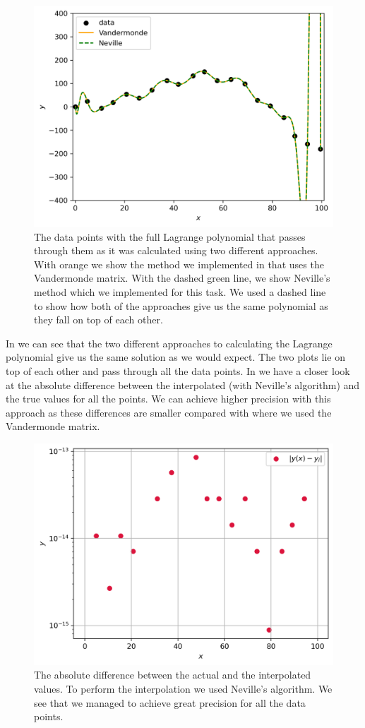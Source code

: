 \documentclass[a4paper,10pt]{article}
\begin{document}
\begin{figure}[H]
  \centering
  \includegraphics[width=0.75\linewidth]{./plots/compare.png}
  \caption{The data points with the full Lagrange polynomial that passes through them as it was calculated using two different approaches. With orange we show the method we implemented in  that uses the Vandermonde matrix. With the dashed green line, we show Neville's method which we implemented for this task. We used a dashed line to show how both of the approaches give us the same polynomial as they fall on top of each other. }
  \label{fig:nev_pol}
\end{figure}

In  we can see that the two different approaches to calculating the Lagrange polynomial give us the same solution as we would expect. The two plots lie on top of each other and pass through all the data points. In  we have a closer look at the absolute difference between the interpolated (with Neville's algorithm) and the true values for all the points. We can achieve higher precision with this approach as these differences are smaller compared with  where we used the Vandermonde matrix.  

\begin{figure}[H]
  \centering
  \includegraphics[width=0.75\linewidth]{./plots/nevil_dif.png}
  \caption{The absolute difference between the actual and the interpolated values. To perform the interpolation we used Neville's algorithm. We see that we managed to achieve great precision for all the data points.}
  \label{fig:nev_dif}
\end{figure}
\end{document}
